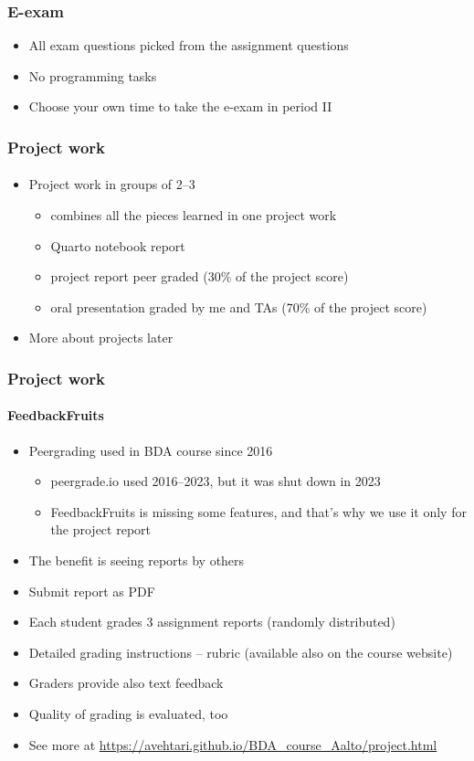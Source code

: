 \documentclass[english,t]{beamer}
\begin{document}
\begin{frame}
  \frametitle{E-exam}  %
  \begin{itemize}
  \item All exam questions picked from the assignment questions
  \item No programming tasks
  \item Choose your own time to take the e-exam in period II%
  \end{itemize}
  
\end{frame}


\begin{frame}
  \frametitle{Project work}  %
  \framesubtitle{}
  \begin{itemize}
  \item Project work in groups of 2--3
    \begin{itemize}
    \item combines all the pieces learned in one project work
    \item Quarto notebook report
    \item project report peer graded (30\% of the project score)
    \item oral presentation graded by me and TAs (70\% of the project score)
    \end{itemize}
  \item More about projects later
  \end{itemize}
  
\end{frame}

\begin{frame}
  \frametitle{Project work}  %
  \framesubtitle{FeedbackFruits}
  \begin{itemize}
  \item Peergrading used in BDA course since 2016
    \begin{itemize}
    \item peergrade.io used 2016--2023, but it was shut down in 2023
    \item FeedbackFruits is missing some features, and that's why we
      use it only for the project report
    \end{itemize}
  \item The benefit is seeing reports by others
  \item Submit report as PDF
  \item Each student grades 3 assignment reports (randomly distributed)
  \item Detailed grading instructions -- rubric (available also on the course website)
  \item Graders provide also text feedback
  \item Quality of grading is evaluated, too
  \item See more at
    \url{https://avehtari.github.io/BDA_course_Aalto/project.html}
  \end{itemize}
  
\end{frame}
\end{document}
